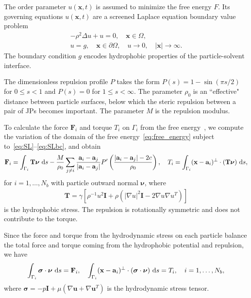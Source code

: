 \documentclass[prb,preprint,showpacs,preprintnumbers,amsmath,amssymb,longbibliography]{revtex4-1}
\renewcommand{\aa}{\mathbf{a}}
\newcommand{\bd}{\partial}
\newcommand{\FF}{\mathbf{F}}
\newcommand{\nnu}{\boldsymbol{\nu}}
\newcommand{\ssigma}{\boldsymbol{\sigma}}
\newcommand{\xx}{\mathbf{x}}
\newcommand{\uu}{\mathbf{u}}
\begin{document}
The order parameter $u(\xx,t)$ is assumed to minimize the free energy
$F$. Its governing equations $u(\xx,t)$ are a screened Laplace equation
boundary value problem
\begin{gather}
  \label{eq:SL}
  -\rho^2 \Delta u + u = 0,\quad \xx \in \Omega, \\
  \label{eq:SLbc}
  u = g, \quad \xx \in \bd\Omega, \quad 
  u \rightarrow 0, \quad |\xx| \rightarrow \infty.
\end{gather}
The boundary condition $g$ encodes hydrophobic properties of the
particle-solvent interface.

The dimensionless repulsion profile $P$ takes the form $P(s) = 1 -
\sin(\pi s/2)$ for $0 \leq s < 1$ and $P(s) = 0$ for $1 \leq s <
\infty$. The parameter $\rho_0$ is an ``effective" distance between
particle surfaces, below which the steric repulsion between a pair of
JPs becomes important. The parameter $M$ is the repulsion modulus.

To calculate the force $\FF_i$ and torque $T_i$ on $\Gamma_i$ from the
free energy~\cite{Fu20}, we compute the variation of the domain of the
free energy~\eqref{eq:free_energy} subject
to~\eqref{eq:SL}--\eqref{eq:SLbc}, and obtain 
\begin{align}
  \FF_i = \int_{\Gamma_i} \mathbf{T}\nnu \, \dif s
  - \frac{M}{\rho_0}
  \sum_{j \neq i}
  \frac{\aa_i - \aa_j}{|\aa_i - \aa_j|}
P'\left(\frac{|\aa_i - \aa_j|-2c}{\rho_0}\right)
  ,\quad
T_i = \int_{\Gamma_i} (\xx - \aa_i)^{\perp}\cdot (\mathbf{T}\nnu) \, \dif s, 
\end{align}
for $i = 1,\ldots,N_b$ with particle outward normal $\nnu$, where
\begin{align}
\mathbf{T} = \gamma \left[ \rho^{-1} u^2 \mathbf{I}
  + \rho \left(|\nabla u|^2 \mathbf{I} - 2\nabla u \nabla u^T\right)\right]
\end{align}
is the hydrophobic stress. The repulsion is rotationally symmetric and
does not contribute to the torque.

Since the force and torque from the hydrodynamic stress on each particle
balance the total force and torque coming from the hydrophobic potential
and repulsion, we have
\begin{equation}
  \label{eq:force}
 \int_{\Gamma_i} \ssigma \cdot \nnu \, \dif s = \FF_i, \quad
 \int_{\Gamma_i} (\xx - \aa_i)^\perp \cdot 
  (\ssigma \cdot \nnu) \, \dif s = T_i,
  \quad i=1,\ldots,N_b,
\end{equation}
where $\ssigma = -p \mathbf{I} + \mu \left(\nabla \uu + \nabla \uu^T
\right)$ is the hydrodynamic stress tensor.
\end{document}
